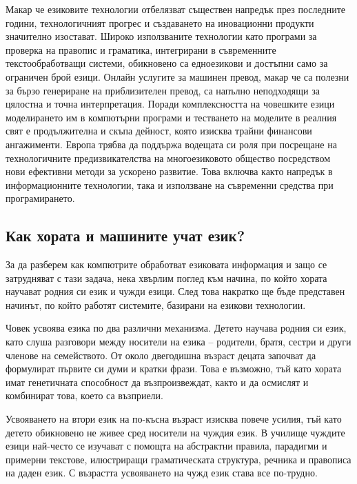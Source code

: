 \documentclass[]{../../metanetpaper}
\begin{document}
\begin{multicols}{2}
Макар че езиковите технологии отбелязват съществен
 напредък през последните години,
 технологичният прогрес и създаването на иновационни продукти значително изостават. Широко използваните технологии като програми за проверка на правопис и граматика, интегрирани в съвременните текстообработващи системи, 
обикновено са едноезикови и достъпни само за ограничен брой езици. 
Онлайн услугите за машинен превод, макар че са полезни за бързо генериране на приблизителен превод, са напълно неподходящи за цялостна и точна интерпретация. Поради комплексността на човешките езици моделирането им в компютърни програми и тестването на моделите в реалния свят е продължителна и скъпа дейност, която изисква трайни финансови ангажименти.  
Европа трябва да поддържа водещата си роля при посрещане на технологичните предизвикателства на многоезиковото общество посредством нови ефективни методи за ускорено развитие. Това включва както напредък в информационните технологии, така и използване на съвременни средства при програмирането.

\subsection{Как хората и машините учат език?}

За да разберем как компютрите обработват езиковата информация и защо се затрудняват с тази задача, нека хвърлим поглед към начина, по който хората научават родния си език и чужди езици. След това
 накратко ще бъде представен начинът, по който работят системите, базирани на езикови технологии.

Човек усвоява езика по два различни механизма. Детето
 научава родния си език, като слуша разговори между
 носители на езика – родители, братя, сестри и други
 членове на семейството. От около двегодишна възраст децата започват да формулират първите си думи и кратки фрази. Това е възможно, тъй като хората имат генетичната способност да възпроизвеждат, както и да осмислят и комбинират това, което са възприели.

Усвояването на втори език на по-късна възраст изисква
 повече усилия, тъй като детето обикновено не живее сред
 носители на чуждия език. В училище чуждите езици най-често се изучават с помощта на абстрактни правила, парадигми и примерни текстове, илюстриращи  граматическата структура, речника и правописа на даден език. С възрастта  усвояването на чужд език става все по-трудно.



\end{multicols}
\end{document}
